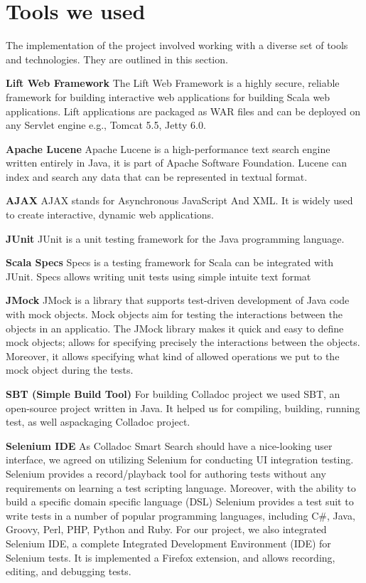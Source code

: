 \section{Tools we used}\label{sec:tools}
The implementation of the project involved working with a diverse set of tools and technologies. They are outlined in this section.

\textbf{Lift Web Framework}
The Lift Web Framework is a highly secure, reliable framework for building interactive web applications for building Scala web applications. Lift applications are packaged as WAR files and can be deployed on any Servlet engine e.g., Tomcat 5.5, Jetty 6.0.

\textbf{Apache Lucene}
Apache Lucene is a high-performance text search engine written entirely in Java, it is part of Apache Software Foundation. Lucene can index and search any data that can be represented in textual format. 

\textbf{AJAX}
AJAX stands for Asynchronous JavaScript And XML. It is widely used to create interactive, dynamic web applications. 

\textbf{JUnit}
JUnit is a unit testing framework for the Java programming language. 

\textbf{Scala Specs}
Specs is a testing framework for Scala can be integrated with JUnit. Specs allows writing unit 
tests using simple intuite text format

\textbf{JMock}
JMock is a library that supports test-driven development of Java code with mock objects. Mock objects aim for testing the interactions between the objects in an applicatio. The JMock library makes it quick and easy to define mock objects; allows for specifying precisely the interactions between the objects. Moreover, it allows specifying what kind of allowed operations we put to the mock object during the tests.

\textbf{SBT (Simple Build Tool)}
For building Colladoc project we used SBT, an open-source project written in Java. It helped us for compiling, building, running test, as well aspackaging Colladoc project. 

\textbf{Selenium IDE}
As Colladoc Smart Search should have a nice-looking user interface, we agreed on utilizing Selenium for conducting UI integration testing. Selenium provides a record/playback tool for authoring tests without any requirements on learning a test scripting language. Moreover, with the ability to build a specific domain specific language (DSL) Selenium provides a test suit to write tests in a number of popular programming languages, including C$\#$, Java, Groovy, Perl, PHP, Python and Ruby. For our project, we also integrated Selenium IDE, a complete Integrated Development Environment (IDE) for Selenium tests. It is implemented a Firefox extension, and allows recording, editing, and debugging tests.

